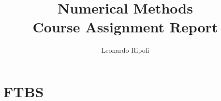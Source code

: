 \documentclass[12pt,mythesisstyle]{report}
\begin{document}
\tablespagetrue



\title{Numerical Methods \\
        Course Assignment Report \\  %
        }

\author{Leonardo Ripoli}


\qualification{}







\beforepreface








%

%



\afterpreface

\onehalfspacing



\chapter{FTBS}\label{chap:chap1}



\end{document}
